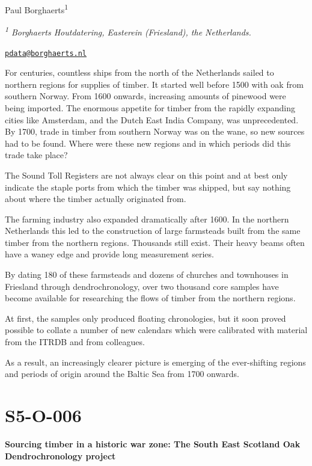\documentclass[
]{book}
\begin{document}
Paul Borghaerts\textsuperscript{1}

\emph{\textsuperscript{1} Borghaerts Houtdatering, Easterein (Friesland), the Netherlands.}

\href{mailto:pdata@borghaerts.nl}{\nolinkurl{pdata@borghaerts.nl}}

For centuries, countless ships from the north of the Netherlands sailed to northern regions for supplies of timber. It started well before 1500 with oak from southern Norway. From 1600 onwards, increasing amounts of pinewood were being imported. The enormous appetite for timber from the rapidly expanding cities like Amsterdam, and the Dutch East India Company, was unprecedented. By 1700, trade in timber from southern Norway was on the wane, so new sources had to be found. Where were these new regions and in which periods did this trade take place?

The Sound Toll Registers are not always clear on this point and at best only indicate the staple ports from which the timber was shipped, but say nothing about where the timber actually originated from.

The farming industry also expanded dramatically after 1600. In the northern Netherlands this led to the construction of large farmsteads built from the same timber from the northern regions. Thousands still exist. Their heavy beams often have a waney edge and provide long measurement series.

By dating 180 of these farmsteads and dozens of churches and townhouses in Friesland through dendrochronology, over two thousand core samples have become available for researching the flows of timber from the northern regions.

At first, the samples only produced floating chronologies, but it soon proved possible to collate a number of new calendars which were calibrated with material from the ITRDB and from colleagues.

As a result, an increasingly clearer picture is emerging of the ever-shifting regions and periods of origin around the Baltic Sea from 1700 onwards.

\hypertarget{s5-o-006}{%
\section*{S5-O-006}\label{s5-o-006}}

\textbf{Sourcing timber in a historic war zone: The South East Scotland Oak Dendrochronology project}
\end{document}
